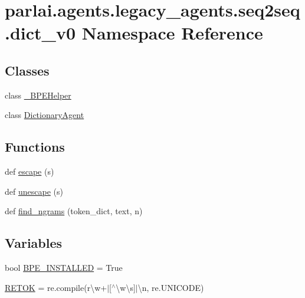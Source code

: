 \hypertarget{namespaceparlai_1_1agents_1_1legacy__agents_1_1seq2seq_1_1dict__v0}{}\section{parlai.\+agents.\+legacy\+\_\+agents.\+seq2seq.\+dict\+\_\+v0 Namespace Reference}
\label{namespaceparlai_1_1agents_1_1legacy__agents_1_1seq2seq_1_1dict__v0}
\subsection*{Classes}
\begin{DoxyCompactItemize}
\item 
class \hyperlink{classparlai_1_1agents_1_1legacy__agents_1_1seq2seq_1_1dict__v0_1_1__BPEHelper}{\+\_\+\+B\+P\+E\+Helper}
\item 
class \hyperlink{classparlai_1_1agents_1_1legacy__agents_1_1seq2seq_1_1dict__v0_1_1DictionaryAgent}{Dictionary\+Agent}
\end{DoxyCompactItemize}
\subsection*{Functions}
\begin{DoxyCompactItemize}
\item 
def \hyperlink{namespaceparlai_1_1agents_1_1legacy__agents_1_1seq2seq_1_1dict__v0_a50d891f5daa90cde2858723889ab0cc8}{escape} (s)
\item 
def \hyperlink{namespaceparlai_1_1agents_1_1legacy__agents_1_1seq2seq_1_1dict__v0_a1803c89a6cc7d5323a31a1f7e79728ed}{unescape} (s)
\item 
def \hyperlink{namespaceparlai_1_1agents_1_1legacy__agents_1_1seq2seq_1_1dict__v0_aa7398720bbf0f8e82c5b1495313f4f8b}{find\+\_\+ngrams} (token\+\_\+dict, text, n)
\end{DoxyCompactItemize}
\subsection*{Variables}
\begin{DoxyCompactItemize}
\item 
bool \hyperlink{namespaceparlai_1_1agents_1_1legacy__agents_1_1seq2seq_1_1dict__v0_a01540308d06a36d0c40cf060811f866b}{B\+P\+E\+\_\+\+I\+N\+S\+T\+A\+L\+L\+ED} = True
\item 
\hyperlink{namespaceparlai_1_1agents_1_1legacy__agents_1_1seq2seq_1_1dict__v0_aeee7b19e8d0821c373027d0e2b146188}{R\+E\+T\+OK} = re.\+compile(r\textquotesingle{}\textbackslash{}w+$\vert$\mbox{[}$^\wedge$\textbackslash{}w\textbackslash{}s\mbox{]}$\vert$\textbackslash{}n\textquotesingle{}, re.\+U\+N\+I\+C\+O\+DE)
\end{DoxyCompactItemize}


